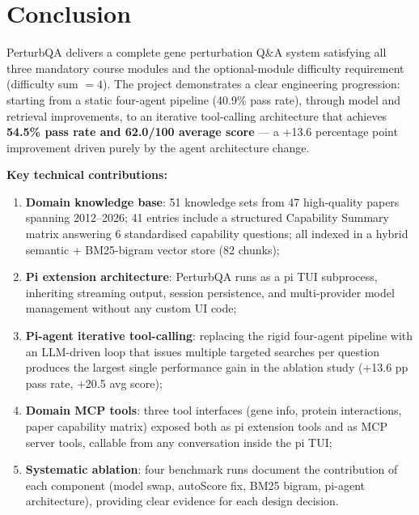 \documentclass[12pt, a4paper]{article}
\begin{document}
\section{Conclusion}

PerturbQA delivers a complete gene perturbation Q\&A system satisfying all three mandatory
course modules and the optional-module difficulty requirement (difficulty sum $= 4$).
The project demonstrates a clear engineering progression: starting from a static
four-agent pipeline (40.9\% pass rate), through model and retrieval improvements,
to an iterative tool-calling architecture that achieves \textbf{54.5\% pass rate and
62.0/100 average score} --- a +13.6 percentage point improvement driven purely by
the agent architecture change.

\textbf{Key technical contributions:}
\begin{enumerate}
  \item \textbf{Domain knowledge base}: 51 knowledge sets from 47 high-quality papers
        spanning 2012--2026; 41 entries include a structured Capability Summary matrix
        answering 6 standardised capability questions; all indexed in a hybrid
        semantic + BM25-bigram vector store (82 chunks);

  \item \textbf{Pi extension architecture}: PerturbQA runs as a pi TUI subprocess,
        inheriting streaming output, session persistence, and multi-provider model
        management without any custom UI code;

  \item \textbf{Pi-agent iterative tool-calling}: replacing the rigid four-agent pipeline with
        an LLM-driven loop that issues multiple targeted searches per question produces
        the largest single performance gain in the ablation study
        (+13.6 pp pass rate, +20.5 avg score);

  \item \textbf{Domain MCP tools}: three tool interfaces (gene info, protein interactions,
        paper capability matrix) exposed both as pi extension tools and as MCP server tools,
        callable from any conversation inside the pi TUI;

  \item \textbf{Systematic ablation}: four benchmark runs document the contribution of
        each component (model swap, autoScore fix, BM25 bigram, pi-agent architecture),
        providing clear evidence for each design decision.
\end{enumerate}
\end{document}
